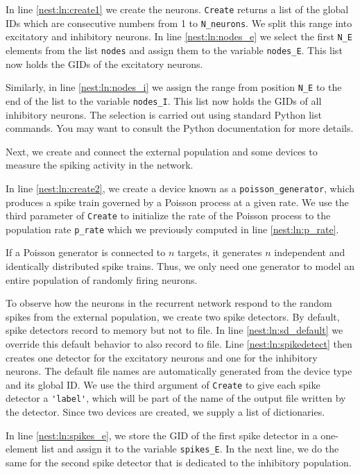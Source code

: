 \documentclass{article}
\begin{document}
In line \ref{nest:ln:create1} we create the neurons. 
\lstinline!Create! returns a list of the global IDs which
are consecutive numbers from 1 to \lstinline!N_neurons!. 
We split this range into excitatory and inhibitory neurons. In
line \ref{nest:ln:nodes_e} we select the first \lstinline!N_E!
elements from the list \lstinline!nodes! and assign them to the
variable \lstinline!nodes_E!. This list now holds the GIDs of the
excitatory neurons. 

Similarly, in line \ref{nest:ln:nodes_i} we assign the range from position
\lstinline!N_E! to the end of the list to the variable
\lstinline!nodes_I!. This list now holds the GIDs of all inhibitory
neurons. The selection is carried out using standard Python list commands. You
may want to consult the Python documentation for more details.

Next, we create and connect the external population and some devices
to measure the spiking activity in the network.

In line \ref{nest:ln:create2}, we create a device known as a
\lstinline!poisson_generator!, which produces a spike train governed
by a Poisson process at a given rate. We use the third parameter of
\lstinline!Create! to initialize the rate of the Poisson process to
the population rate \lstinline!p_rate!  which we previously computed
in line \ref{nest:ln:p_rate}.

If a Poisson generator is connected to $n$ targets, it generates $n$
independent and identically distributed spike trains. Thus, we only
need one generator to model an entire population of randomly firing
neurons.

To observe how the neurons in the recurrent network respond to the 
random spikes from the external population, we create two spike detectors.
By default, spike detectors record to memory but not to file. In line 
\ref{nest:ln:sd_default} we override this default behavior to also record
to file. Line \ref{nest:ln:spikedetect} then creates one detector for the 
excitatory neurons and one for the inhibitory neurons. 
The default file names are automatically generated from the device type and
its global ID. We use the third argument of \lstinline!Create! to give each 
spike detector a \lstinline!'label'!, which will be part of the name of the 
output file written by the detector. Since two devices are created, we supply
a list of dictionaries.

In line \ref{nest:ln:spikes_e}, we store the GID of the first spike
detector in a one-element list and assign it to the variable
\lstinline!spikes_E!. In the next line, we do the same for the second
spike detector that is dedicated to the inhibitory population.
\end{document}
